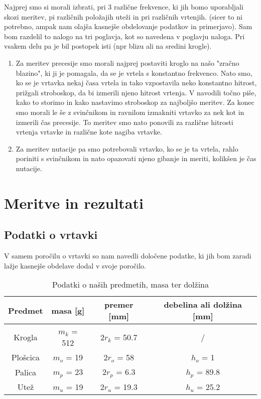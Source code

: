 \documentclass[11pt, a4paper]{article}
\theoremstyle{definition}
\theoremstyle{example}
\theoremstyle{izrek}
\begin{document}
Najprej smo si morali izbrati, pri 3 različne frekvence, ki jih bomo uporabljali skozi meritev, pi različnih položajih uteži in pri različnih vrtenjih. (sicer to ni potrebno, ampak nam olajša kasnejše obdelovanje podatkov in primerjavo).
Sam bom razdelil to nalogo na tri poglavja, kot so navedena v poglavju naloga. Pri vsakem delu pa je bil postopek isti (npr blizu ali na sredini krogle).
\begin{enumerate}
\item Za meritev precesije smo morali najprej postaviti kroglo na našo "zračno blazino", ki ji je pomagala, da se je vrtela s konstantno frekvenco. Nato smo, ko se je vrtavka nekaj časa vrtela in tako vzpostavila neko konstantno hitrost, prižgali stroboskop, da bi izmerili njeno hitrost vrtenja. V navodili točno piše, kako to storimo in kako nastavimo stroboskop za najboljšo meritev. Za konec smo morali le še z svinčnikom in ravnilom izmakniti vrtavko za nek kot in izmerili čas precesije. To meritev smo nato ponovili za različne hitrosti vrtenja vrtavke in različne kote nagiba vrtavke. 
\item Za meritev nutacije pa smo potrebovali vrtavko, ko se je ta vrtela, rahlo poriniti s svinčnikom in nato opazovati njeno gibanje in meriti, kolikšen je čas nutacije.
\end{enumerate}

\pagebreak
\section{Meritve in rezultati}
\subsection{Podatki o vrtavki}

V samem poročilu o vrtavki so nam navedli določene podatke, ki jih bom zaradi lažje kasnejše obdelave dodal v svoje poročilo.
\begin{table}[ht]
	\centering
	\begin{tabular}{|c|c|c|c|}
		\hline
		Predmet & masa [g] & premer [mm] & debelina ali dolžina [mm] \\
		\hline
		\hline
		Krogla & $m_k$ = 512 & $2r_k$ = 50.7 & / \\
		\hline
		Plošcica & $m_o$ = 19 & $2r_o$ = 58 & $h_o$ = 1\\
		\hline
		Palica & $m_p$ = 23 & $2r_p$ = 6.3 & $h_p$ = 89.8\\
		\hline
		Utež & $m_u$ = 19 & $2r_u$ = 19.3 & $h_u$ = 25.2 \\
		\hline
		\end{tabular}
		\caption{Podatki o naših predmetih, masa ter dolžina}
		\label{tab:FirstTable}
\end{table}
\end{document}
